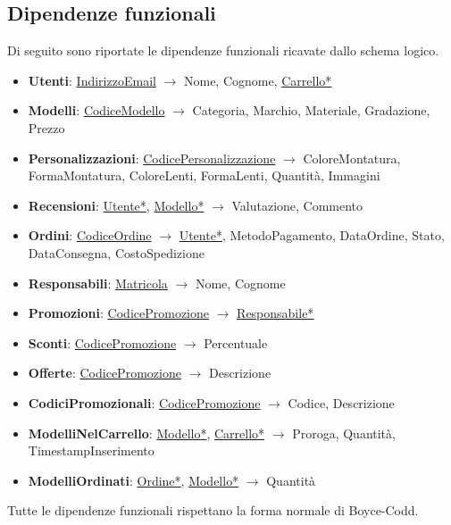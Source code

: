 \subsection{Dipendenze funzionali}
Di seguito sono riportate le dipendenze funzionali ricavate dallo schema logico.
\begin{itemize}
	\item \textbf{Utenti}: \underline{IndirizzoEmail} $\rightarrow$ Nome, Cognome,
	      \underline{Carrello*}
	\item \textbf{Modelli}: \underline{CodiceModello} $\rightarrow$ Categoria, Marchio, Materiale,
	      Gradazione, Prezzo
	\item \textbf{Personalizzazioni}: \underline{CodicePersonalizzazione} $\rightarrow$
	      ColoreMontatura, FormaMontatura, ColoreLenti, FormaLenti, Quantità, Immagini
	\item \textbf{Recensioni}: \underline{Utente*}, \underline{Modello*} $\rightarrow$ Valutazione,
	      Commento
	\item \textbf{Ordini}: \underline{CodiceOrdine} $\rightarrow$ \underline{Utente*},
	      MetodoPagamento, DataOrdine, Stato, DataConsegna, CostoSpedizione
	\item \textbf{Responsabili}: \underline{Matricola} $\rightarrow$ Nome, Cognome
	\item \textbf{Promozioni}: \underline{CodicePromozione} $\rightarrow$ \underline{Responsabile*}
	\item \textbf{Sconti}: \underline{CodicePromozione} $\rightarrow$ Percentuale
	\item \textbf{Offerte}: \underline{CodicePromozione} $\rightarrow$ Descrizione
	\item \textbf{CodiciPromozionali}: \underline{CodicePromozione} $\rightarrow$ Codice,
	      Descrizione
	\item \textbf{ModelliNelCarrello}: \underline{Modello*}, \underline{Carrello*} $\rightarrow$
	      Proroga, Quantità, TimestampInserimento
	\item \textbf{ModelliOrdinati}: \underline{Ordine*}, \underline{Modello*} $\rightarrow$ Quantità
\end{itemize}
Tutte le dipendenze funzionali rispettano la forma normale di Boyce-Codd.
